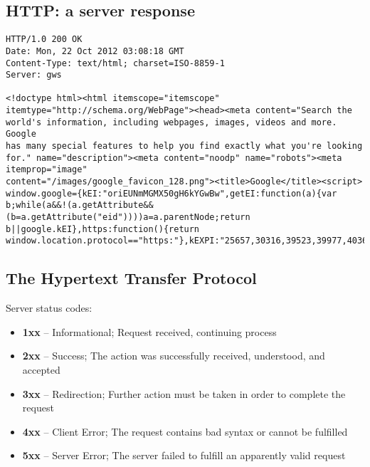 \documentclass[xga]{xdvislides}
\begin{document}
\subsection{HTTP: a server response}
\begin{verbatim}
HTTP/1.0 200 OK
Date: Mon, 22 Oct 2012 03:08:18 GMT
Content-Type: text/html; charset=ISO-8859-1
Server: gws

<!doctype html><html itemscope="itemscope"
itemtype="http://schema.org/WebPage"><head><meta content="Search the
world's information, including webpages, images, videos and more. Google
has many special features to help you find exactly what you're looking
for." name="description"><meta content="noodp" name="robots"><meta
itemprop="image"
content="/images/google_favicon_128.png"><title>Google</title><script>
window.google={kEI:"oriEUNmMGMX50gH6kYGwBw",getEI:function(a){var
b;while(a&&!(a.getAttribute&&(b=a.getAttribute("eid"))))a=a.parentNode;return
b||google.kEI},https:function(){return
window.location.protocol=="https:"},kEXPI:"25657,30316,39523,39977,40362
\end{verbatim}

\subsection{The Hypertext Transfer Protocol}
Server status codes:
\begin{itemize}
	\item {\bf 1xx} -- Informational; Request received, continuing process
	\item {\bf 2xx} -- Success; The action was successfully received,
        understood, and accepted
	\item {\bf 3xx} -- Redirection; Further action must be taken in order to
        complete the request
	\item {\bf 4xx} -- Client Error; The request contains bad syntax or
		cannot be fulfilled
	\item {\bf 5xx} -- Server Error; The server failed to fulfill an
		apparently valid request
\end{itemize}
\end{document}
